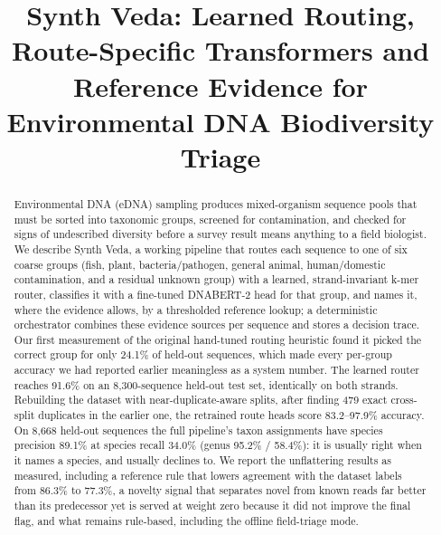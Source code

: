 \documentclass[conference]{IEEEtran}
\begin{document}
\title{Synth Veda: Learned Routing, Route-Specific Transformers and Reference Evidence for Environmental DNA Biodiversity Triage}

\author{
}

\maketitle

\begin{abstract}
Environmental DNA (eDNA) sampling produces mixed-organism sequence pools that must be sorted into taxonomic groups, screened for contamination, and checked for signs of undescribed diversity before a survey result means anything to a field biologist. We describe Synth Veda, a working pipeline that routes each sequence to one of six coarse groups (fish, plant, bacteria/pathogen, general animal, human/domestic contamination, and a residual unknown group) with a learned, strand-invariant k-mer router, classifies it with a fine-tuned DNABERT-2 head for that group, and names it, where the evidence allows, by a thresholded reference lookup; a deterministic orchestrator combines these evidence sources per sequence and stores a decision trace. Our first measurement of the original hand-tuned routing heuristic found it picked the correct group for only 24.1\% of held-out sequences, which made every per-group accuracy we had reported earlier meaningless as a system number. The learned router reaches 91.6\% on an 8{,}300-sequence held-out test set, identically on both strands. Rebuilding the dataset with near-duplicate-aware splits, after finding 479 exact cross-split duplicates in the earlier one, the retrained route heads score 83.2--97.9\% accuracy. On 8{,}668 held-out sequences the full pipeline's taxon assignments have species precision 89.1\% at species recall 34.0\% (genus 95.2\% / 58.4\%): it is usually right when it names a species, and usually declines to. We report the unflattering results as measured, including a reference rule that lowers agreement with the dataset labels from 86.3\% to 77.3\%, a novelty signal that separates novel from known reads far better than its predecessor yet is served at weight zero because it did not improve the final flag, and what remains rule-based, including the offline field-triage mode.
\end{abstract}
\end{document}
